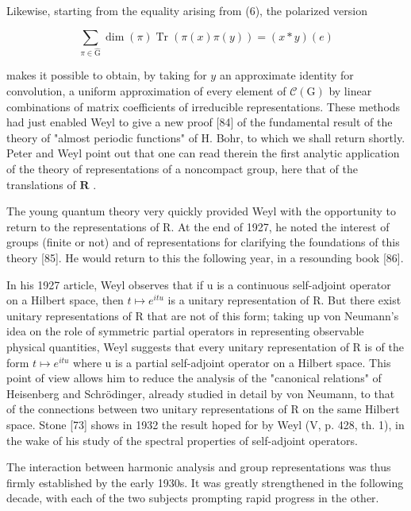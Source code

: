 Likewise, starting from the equality arising from (6), the polarized version

\[
\sum_ {\pi \in \widehat {\mathrm{G}}} \dim (\pi) \operatorname{Tr} (\pi (x) \pi (y)) = (x * y) (e)\tag{7}
\]

makes it possible to obtain, by taking for \(y\) an approximate identity for convolution, a uniform approximation of every element of \(\mathcal{C}(\mathrm{G})\) by linear combinations of matrix coefficients of irreducible representations. These methods had just enabled Weyl to give a new proof {[}84{]} of the fundamental result of the theory of "almost periodic functions" of H. Bohr, to which we shall return shortly. Peter and Weyl point out that one can read therein the first analytic application of the theory of representations of a noncompact group, here that of the translations of \(\mathbf{R}\) .

The young quantum theory very quickly provided Weyl with the opportunity to return to the representations of R. At the end of 1927, he noted the interest of groups (finite or not) and of representations for clarifying the foundations of this theory {[}85{]}. He would return to this the following year, in a resounding book {[}86{]}.

In his 1927 article, Weyl observes that if u is a continuous self-adjoint operator on a Hilbert space, then \(t \mapsto e^{itu}\) is a unitary representation of R. But there exist unitary representations of R that are not of this form; taking up von Neumann's idea on the role of symmetric partial operators in representing observable physical quantities, Weyl suggests that every unitary representation of R is of the form \(t \mapsto e^{itu}\) where u is a partial self-adjoint operator on a Hilbert space. This point of view allows him to reduce the analysis of the "canonical relations" of Heisenberg and Schrödinger, already studied in detail by von Neumann, to that of the connections between two unitary representations of R on the same Hilbert space. Stone {[}73{]} shows in 1932 the result hoped for by Weyl (V, p. 428, th. 1), in the wake of his study of the spectral properties of self-adjoint operators.


The interaction between harmonic analysis and group representations was thus firmly established by the early 1930s. It was greatly strengthened in the following decade, with each of the two subjects prompting rapid progress in the other.

